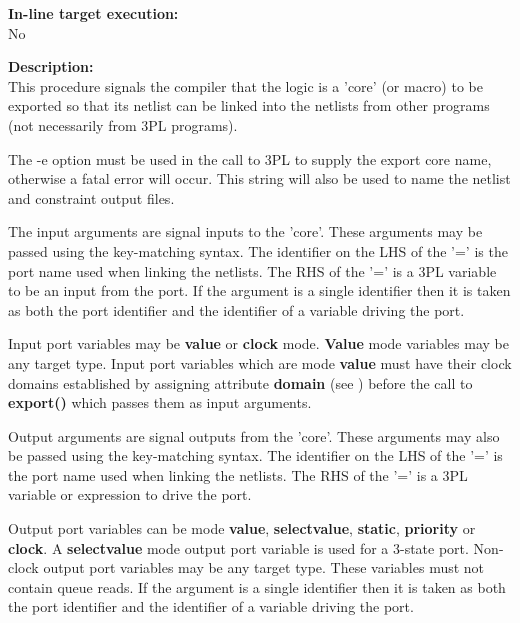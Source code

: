         {\bf In-line target execution:} \\
        No
        
        {\bf Description:} \\
        This procedure signals the compiler that the logic is a 'core'
        (or macro) to be exported so that its netlist can be linked into the
        netlists from other programs (not necessarily from 3PL programs).        
        
        The -e option must be used in the call to 3PL to supply the export core
        name, otherwise a fatal error will occur. This string will also be used
        to name the netlist and constraint output files.
        
        The input arguments are signal inputs to the 'core'. These arguments may
        be passed using the key-matching syntax. The identifier on the LHS of
        the '=' is the port name used when linking the netlists. The RHS of the
        '=' is a 3PL variable to be an input from the port. If the argument is a
        single identifier then it is taken as both the port identifier and the
        identifier of a variable driving the port.
        
        Input port variables may be {\bf value} or {\bf clock} mode. {\bf Value}
        mode variables may be any target type. Input port variables which are
        mode {\bf value} must have their clock domains established by assigning
        attribute {\bf domain} (see ) before the call
        to {\bf export()} which passes them as input arguments.
        
        Output arguments are signal outputs from the 'core'. These arguments
        may also be passed using the key-matching syntax. The identifier
        on the LHS of the '=' is the port name used when linking the netlists.
        The RHS of the '=' is a 3PL variable or expression to drive the port.
        
        Output port variables can be mode {\bf value}, {\bf selectvalue}, {\bf
        static}, {\bf priority} or {\bf clock}. A {\bf selectvalue} mode output
        port variable is used for a 3-state port. Non-clock output port
        variables may be any target type. These variables must not contain queue
        reads. If the argument is a single identifier then it is taken as both
        the port identifier and the identifier of a variable driving the
        port.    
        


